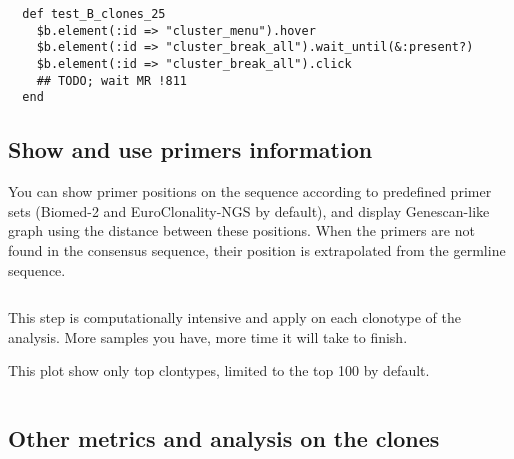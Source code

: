 \begin{verbatim}
  def test_B_clones_25
    $b.element(:id => "cluster_menu").hover
    $b.element(:id => "cluster_break_all").wait_until(&:present?)
    $b.element(:id => "cluster_break_all").click
    ## TODO; wait MR !811
  end
\end{verbatim}

\subsection{Show and use primers information}

You can show primer positions on the sequence according to predefined primer sets 
(Biomed-2 and EuroClonality-NGS by default), and display Genescan-like graph 
using the distance between these positions.
When the primers are not found in the consensus sequence, their position is
extrapolated from the germline sequence.



\begin{verbatim}
\end{verbatim}

This step is computationally intensive and apply on each clonotype of the analysis.
More samples you have, more time it will take to finish.


This plot show only top clontypes, limited to the top 100 by default.



\begin{verbatim}
\end{verbatim}



\subsection{Other metrics and analysis on the clones}


